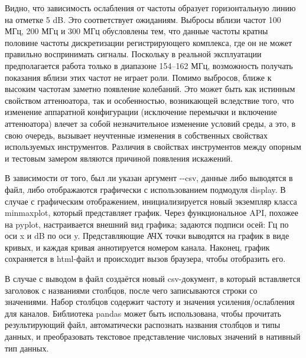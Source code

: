 \documentclass{report}
\begin{document}

Видно, что зависимость ослабления от частоты образует горизонтальную линию на отметке 5 dB. Это соответствует ожиданиям. Выбросы вблизи частот 100 МГц, 200 МГц и 300 МГц обусловлены тем, что данные частоты кратны половине частоты дискретизации регистрирующего комплекса, где он не может правильно воспринимать сигналы. Поскольку в реальной эксплуатации предполагается работа только в диапазоне 154--162 МГц, возможность получать показания вблизи этих частот не играет роли. Помимо выбросов, ближе к высоким частотам заметно появление колебаний. Это может быть как истинным свойством аттенюатора, так и особенностью, возникающей вследствие того, что изменение аппаратной конфигурации (исключение перемычки и включение аттенюатора) влечет за собой незначительное изменение условий среды, а это, в свою очередь, вызывает неучтенные изменения в собственных свойствах используемых инструментов. Различия в свойствах инструментов между опорным и тестовым замером являются причиной появления искажений.

В зависимости от того, был ли указан аргумент -{}-csv, данные либо выводятся в файл, либо отображаются графически с использованием подмодуля display. В случае с графическим отображением, инициализируется новый экземпляр класса minmaxplot, который представляет график. Через функциональное API, похожее на pyplot, настраивается внешний вид графика; задаются подписи осей: Гц по оси x и dB по оси y. Представляющие АЧХ точки выводятся на график в виде кривых, и каждая кривая аннотируется номером канала. Наконец, график сохраняется в html-файл и происходит вызов браузера, чтобы отобразить его.

В случае с выводом в файл создаётся новый csv-документ, в который вставляется заголовок с названиями столбцов, после чего записываются строки со значениями. Набор столбцов содержит частоту и значения усиления/ослабления для каналов. Библиотека pandas может быть использована, чтобы прочитать результирующий файл, автоматически распознать названия столбцов и типы данных, и преобразовать текстовое представление числовых значений в нативный тип данных.
\end{document}
